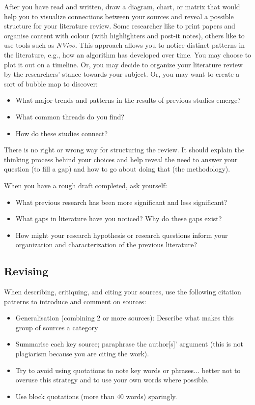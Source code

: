 After you have read and written, draw a diagram, chart, or matrix that would help you to visualize
connections between your sources and reveal a possible structure for your literature review. Some
researcher like to print papers and organise content with colour (with highlighters and post-it
notes), others like to use tools such as \textit{NVivo}. This approach allows you to notice
distinct patterns in the literature, e.g., how an algorithm has developed over time. You may choose
to plot it out on a timeline. Or, you may decide to organize your literature review by the
researchers' stance towards your subject. Or, you may want to create a sort of bubble map to
discover:
\begin{itemize}
	\item What major trends and patterns in the results of previous studies emerge?
	\item What common threads do you find?
	\item How do these studies connect?
\end{itemize}

There is no right or wrong way for structuring the review. It should explain the thinking process
behind your choices and help reveal the need to answer your question (to fill a gap) and how to go
about doing that (the methodology).

When you have a rough draft completed, ask yourself:
\begin{itemize}
	\item What previous research has been more significant and less significant?
	\item What gaps in literature have you noticed? Why do these gaps exist?
	\item How might your research hypothesis or research questions inform your organization and
	      characterization of the previous literature?
\end{itemize}

\subsection{Revising}
When describing, critiquing, and citing your sources, use the following citation patterns to
introduce and comment on sources:
\begin{itemize}
	\item Generalisation (combining 2 or more sources): Describe what makes this group of sources a category
	\item Summarise each key source; paraphrase the author[s]' argument (this is not plagiarism because you
	      are citing the work).
	\item Try to avoid using quotations to note key words or phrases... better not to overuse this strategy
	      and to use your own words where possible.
	\item Use block quotations (more than 40 words) sparingly.
\end{itemize}

